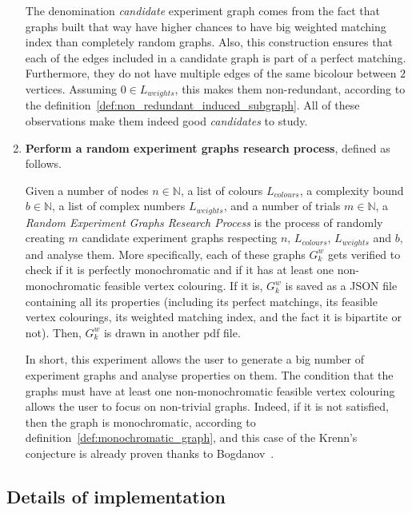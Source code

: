 \begin{enumerate}
    The denomination \textit{candidate} experiment graph comes from the fact that graphs built that way have higher chances to have big weighted matching index than completely random graphs.
    Also, this construction ensures that each of the edges included in a candidate graph is part of a perfect matching.
    Furthermore, they do not have multiple edges of the same bicolour between $2$ vertices.
    Assuming $0 \in L_{weights}$, this makes them non-redundant, according to the definition~\ref{def:non_redundant_induced_subgraph}.
    All of these observations make them indeed good \textit{candidates} to study.

    \item \textbf{Perform a random experiment graphs research process}, defined as follows.
        \begin{definition}
            \label{def:random_experiment_graphs_research_process}
            Given a number of nodes $n \in \mathbb{N}$, a list of colours $L_{colours}$, a complexity bound $b \in \mathbb{N}$, a list of complex numbers $L_{weights}$, and a number of trials $m \in \mathbb{N}$, a \textit{Random Experiment Graphs Research Process} is the process of randomly creating $m$ candidate experiment graphs respecting $n$, $L_{colours}$, $L_{weights}$ and $b$, and analyse them.
            More specifically, each of these graphs $G_k^w$ gets verified to check if it is perfectly monochromatic and if it has at least one non-monochromatic feasible vertex colouring.
            If it is, $G_k^w$ is saved as a JSON file containing all its properties (including its perfect matchings, its feasible vertex colourings, its weighted matching index, and the fact it is bipartite or not).
            Then, $G_k^w$ is drawn in another pdf file.
        \end{definition}

        In short, this experiment allows the user to generate a big number of experiment graphs and analyse properties on them.
        The condition that the graphs must have at least one non-monochromatic feasible vertex colouring allows the user to focus on non-trivial graphs.
        Indeed, if it is not satisfied, then the graph is monochromatic, according to definition~\ref{def:monochromatic_graph}, and this case of the Krenn's conjecture is already proven thanks to Bogdanov~\cite{bogdanov}.

\end{enumerate}


\subsection{Details of implementation}
\label{subsec:details-of-implementation}

